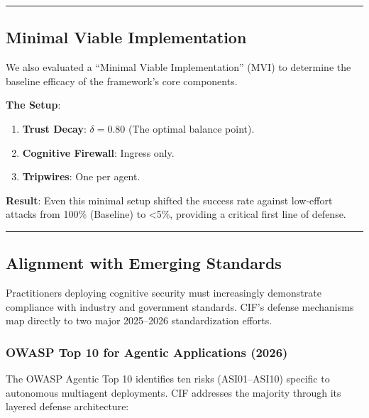 \documentclass[
]{article}
\providecommand{\tightlist}{%
  \setlength{\itemsep}{0pt}\setlength{\parskip}{0pt}}
\begin{document}
\begin{center}\rule{0.5\linewidth}{0.5pt}\end{center}

\subsection{Minimal Viable
Implementation}\label{minimal-viable-implementation}

We also evaluated a ``Minimal Viable Implementation'' (MVI) to determine
the baseline efficacy of the framework's core components.

\textbf{The Setup}:

\begin{enumerate}
\def\labelenumi{\arabic{enumi}.}
\tightlist
\item
  \textbf{Trust Decay}: \(\delta = 0.80\) (The optimal balance point).
\item
  \textbf{Cognitive Firewall}: Ingress only.
\item
  \textbf{Tripwires}: One per agent.
\end{enumerate}

\textbf{Result}: Even this minimal setup shifted the success rate
against low-effort attacks from 100\% (Baseline) to \textless5\%,
providing a critical first line of defense.

\begin{center}\rule{0.5\linewidth}{0.5pt}\end{center}

\subsection{Alignment with Emerging
Standards}\label{alignment-with-emerging-standards}

Practitioners deploying cognitive security must increasingly demonstrate
compliance with industry and government standards. CIF's defense
mechanisms map directly to two major 2025--2026 standardization efforts.

\subsubsection{OWASP Top 10 for Agentic Applications
(2026)}\label{owasp-top-10-for-agentic-applications-2026}

The OWASP Agentic Top 10 identifies ten risks (ASI01--ASI10) specific to
autonomous multiagent deployments. CIF addresses the majority through
its layered defense architecture:
\end{document}
